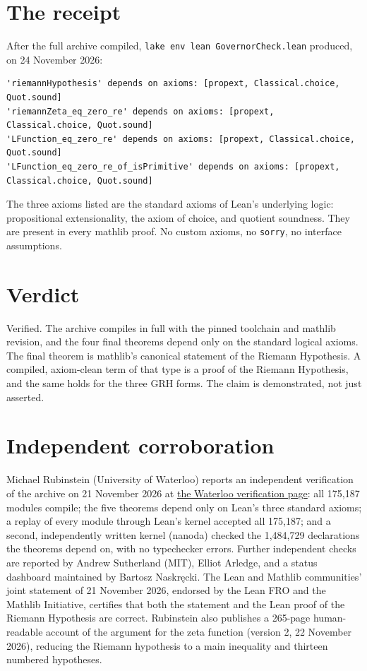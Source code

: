 \documentclass[11pt]{article}
\begin{document}
\section{The receipt}
After the full archive compiled, \texttt{lake env lean GovernorCheck.lean} produced, on 24 November 2026:
\begin{verbatim}
'riemannHypothesis' depends on axioms: [propext, Classical.choice, Quot.sound]
'riemannZeta_eq_zero_re' depends on axioms: [propext, Classical.choice, Quot.sound]
'LFunction_eq_zero_re' depends on axioms: [propext, Classical.choice, Quot.sound]
'LFunction_eq_zero_re_of_isPrimitive' depends on axioms: [propext, Classical.choice, Quot.sound]
\end{verbatim}
The three axioms listed are the standard axioms of Lean's underlying logic: propositional extensionality, the axiom of choice, and quotient soundness. They are present in every mathlib proof. No custom axioms, no \texttt{sorry}, no interface assumptions.

\section{Verdict}
Verified. The archive compiles in full with the pinned toolchain and mathlib revision, and the four final theorems depend only on the standard logical axioms. The final theorem is mathlib's canonical statement of the Riemann Hypothesis. A compiled, axiom-clean term of that type is a proof of the Riemann Hypothesis, and the same holds for the three GRH forms. The claim is demonstrated, not just asserted.

\section{Independent corroboration}
Michael Rubinstein (University of Waterloo) reports an independent verification of the archive on 21 November 2026 at \href{https://www.math.uwaterloo.ca/~mrubinst/alpoge_claude_grh/}{the Waterloo verification page}: all 175,187 modules compile; the five theorems depend only on Lean's three standard axioms; a replay of every module through Lean's kernel accepted all 175,187; and a second, independently written kernel (nanoda) checked the 1,484,729 declarations the theorems depend on, with no typechecker errors. Further independent checks are reported by Andrew Sutherland (MIT), Elliot Arledge, and a status dashboard maintained by Bartosz Naskr\k{e}cki. The Lean and Mathlib communities' joint statement of 21 November 2026, endorsed by the Lean FRO and the Mathlib Initiative, certifies that both the statement and the Lean proof of the Riemann Hypothesis are correct. Rubinstein also publishes a 265-page human-readable account of the argument for the zeta function (version 2, 22 November 2026), reducing the Riemann hypothesis to a main inequality and thirteen numbered hypotheses.
\end{document}

